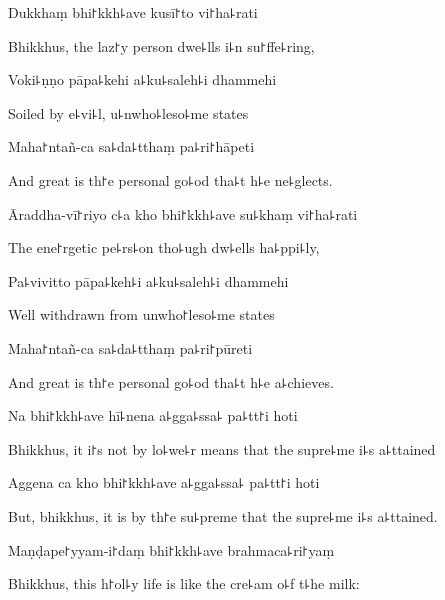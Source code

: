 Dukkhaṃ bhi꜓kkh꜕ave kusī꜓to vi꜓ha꜕rati

\begin{english}
  Bhikkhus, the laz꜓y person dwe꜕lls i꜕n su꜓ffe꜕ring,
\end{english}

Voki꜕ṇṇo pāpa꜕kehi a꜕ku꜕saleh꜕i dhammehi

\begin{english}
  Soiled by e꜕vi꜕l, u꜕nwho꜕leso꜕me states
\end{english}

Maha꜓ntañ-ca sa꜕da꜕tthaṃ pa꜕ri꜓hāpeti

\begin{english}
  And great is th꜓e personal go꜕od tha꜕t h꜕e ne꜕glects.
\end{english}

Āraddha-vī꜓riyo c꜕a kho bhi꜓kkh꜕ave su꜕khaṃ vi꜓ha꜕rati

\begin{english}
  The ene꜓rgetic pe꜕rs꜕on tho꜕ugh dw꜕ells ha꜕ppi꜕ly,
\end{english}

Pa꜕vivitto pāpa꜕keh꜕i a꜕ku꜕saleh꜕i dhammehi

\begin{english}
  Well withdrawn from unwho꜓leso꜕me states
\end{english}

Maha꜓ntañ-ca sa꜕da꜕tthaṃ pa꜕ri꜓pūreti

\begin{english}
  And great is th꜓e personal go꜕od tha꜕t h꜕e a꜕chieves.
\end{english}

Na bhi꜓kkh꜕ave hī꜕nena a꜕gga꜕ssa꜕ pa꜕tt꜓i hoti

\begin{english}
  Bhikkhus, it i꜓s not by lo꜕we꜕r means that the supre꜕me i꜕s a꜕ttained
\end{english}

Aggena ca kho bhi꜓kkh꜕ave a꜕gga꜕ssa꜕ pa꜕tt꜓i hoti

\begin{english}
  But, bhikkhus, it is by th꜓e su꜕preme that the supre꜕me i꜕s a꜕ttained.
\end{english}

Maṇḍape꜓yyam-i꜓daṃ bhi꜓kkh꜕ave brahmaca꜕ri꜓yaṃ

\begin{english}
  Bhikkhus, this h꜓ol꜕y life is like the cre꜕am o꜕f t꜕he milk:
\end{english}

